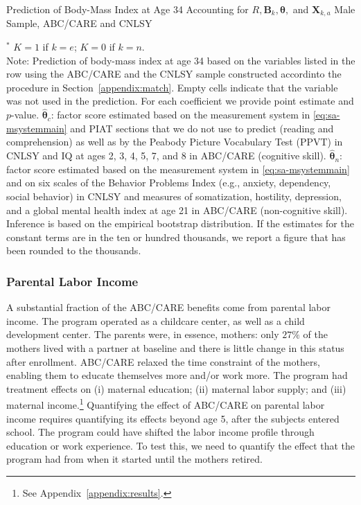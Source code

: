\begin{table}
\begin{threeparttable}
\caption{Prediction of Body-Mass Index at Age 34 Accounting for $R, \bm{B}_k, \bm{\theta},$ and $\bm{X}_{k,a}$ Male Sample, ABC/CARE and CNLSY}
\label{table:invfin}
\centering
\scriptsize

\begin{tablenotes}
\footnotesize
\item $^\ast$ $K=1$ if $k=e$; $K=0$ if $k=n$.\\
Note: Prediction of body-mass index at age 34 based on the variables listed in the row using the ABC/CARE and the CNLSY sample constructed accordinto the procedure in Section~\ref{appendix:match}. Empty cells indicate that the variable was not used in the prediction. For each coefficient we provide point estimate and $p$-value. $\hat{\bm{\theta}}_{c}$: factor score estimated based on the measurement system in \eqref{eq:sa-msystemmain} and PIAT sections that we do not use to predict (reading and comprehension) as well as by the Peabody Picture Vocabulary Test (PPVT) in CNLSY and IQ at ages 2, 3, 4, 5, 7, and 8 in ABC/CARE (cognitive skill). $\hat{\bm{\theta}}_{n}$: factor score estimated based on the measurement system in \eqref{eq:sa-msystemmain} and on six scales of the Behavior Problems Index (e.g., anxiety, dependency, social behavior) in CNLSY and measures of somatization, hostility, depression, and a global mental health index at age 21 in ABC/CARE (non-cognitive skill). Inference is based on the empirical bootstrap distribution. If the estimates for the constant terms are in the ten or hundred thousands, we report a figure that has been rounded to the thousands.
\end{tablenotes}
\end{threeparttable}
\end{table}

\subsubsection{Parental Labor Income}\label{app:parentalincome}

\noindent A substantial fraction of the ABC/CARE benefits come from parental labor income. The program operated as a childcare center, as well as a child development center. The parents were, in essence,  mothers: only $27\%$ of the mothers lived with a partner at baseline and there is little change in this status after enrollment. ABC/CARE relaxed the time constraint of the mothers, enabling them to educate themselves more and/or work more. The program had treatment effects on (i) maternal education; (ii) maternal labor supply; and (iii) maternal income.\footnote{See Appendix~\ref{appendix:results}.} Quantifying the effect of ABC/CARE on parental labor income requires quantifying its effects beyond age 5, after the subjects entered school. The program could have shifted the labor income profile through education or work experience. To test this, we need to quantify the effect that the program had from when it started until the mothers retired.\\

